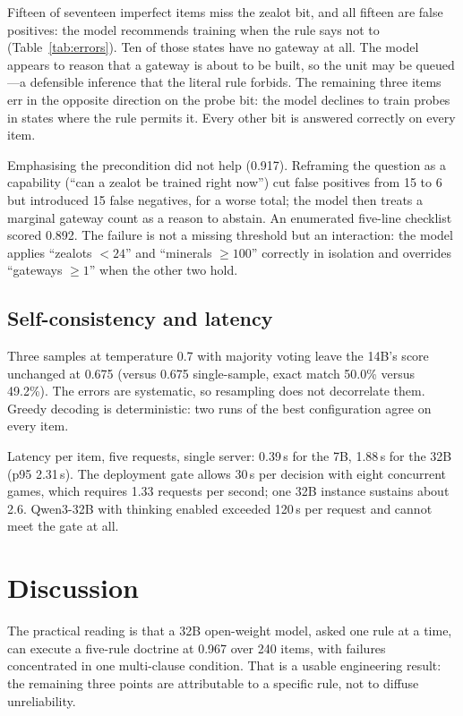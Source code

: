 \documentclass[journal]{IEEEtran}
\begin{document}
Fifteen of seventeen imperfect items miss the zealot bit, and all fifteen are false positives:
the model recommends training when the rule says not to (Table~\ref{tab:errors}). Ten of those
states have no gateway at all. The model appears to reason that a gateway is about to be built,
so the unit may be queued---a defensible inference that the literal rule forbids. The remaining
three items err in the opposite direction on the probe bit: the model declines to train probes
in states where the rule permits it. Every other bit is answered correctly on every item.

Emphasising the precondition did not help (0.917). Reframing the question as a capability
(``can a zealot be trained right now'') cut false positives from 15 to 6 but introduced 15
false negatives, for a worse total; the model then treats a marginal gateway count as a reason
to abstain. An enumerated five-line checklist scored 0.892. The failure is not a missing
threshold but an interaction: the model applies ``zealots $<24$'' and ``minerals $\ge 100$''
correctly in isolation and overrides ``gateways $\ge 1$'' when the other two hold.

\subsection{Self-consistency and latency}

Three samples at temperature 0.7 with majority voting leave the 14B's score unchanged at 0.675
(versus 0.675 single-sample, exact match 50.0\% versus 49.2\%). The errors are systematic, so
resampling does not decorrelate them. Greedy decoding is deterministic: two runs of the best
configuration agree on every item.

Latency per item, five requests, single server: 0.39\,s for the 7B, 1.88\,s for the 32B
(p95 2.31\,s). The deployment gate allows 30\,s per decision with eight concurrent games, which
requires 1.33 requests per second; one 32B instance sustains about 2.6. Qwen3-32B with thinking
enabled exceeded 120\,s per request and cannot meet the gate at all.

\section{Discussion}

The practical reading is that a 32B open-weight model, asked one rule at a time, can execute a
five-rule doctrine at 0.967 over 240 items, with failures concentrated in one multi-clause
condition. That is a usable engineering result: the remaining three points are attributable to a
specific rule, not to diffuse unreliability.
\end{document}
